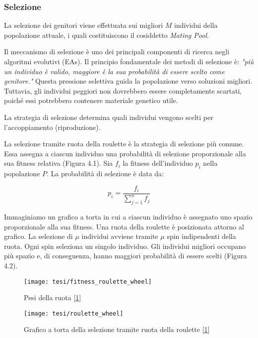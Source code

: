 \subsubsection{Selezione}

La selezione dei genitori viene effettuata sui migliori \( M \) individui della popolazione attuale, i quali costituiscono il cosiddetto \emph{Mating Pool}.

Il meccanismo di selezione è uno dei principali componenti di ricerca negli algoritmi evolutivi (EAs). Il principio fondamentale dei metodi di selezione è: \emph{"più un individuo è valido, maggiore è la sua probabilità di essere scelto come genitore."} Questa pressione selettiva guida la popolazione verso soluzioni migliori. Tuttavia, gli individui peggiori non dovrebbero essere completamente scartati, poiché essi potrebbero contenere materiale genetico utile.

La strategia di selezione determina quali individui vengono scelti per l'accoppiamento (riproduzione).

La selezione tramite ruota della roulette è la strategia di selezione più comune. Essa assegna a ciascun individuo una probabilità di selezione proporzionale alla sua fitness relativa (Figura 4.1). Sia $f_i$ la fitness dell'individuo $p_i$ nella popolazione $P$. La probabilità di selezione è data da:

\[ p_i = \frac{f_i}{\sum_{j=1}^{n} f_j} \]

Immaginiamo un grafico a torta in cui a ciascun individuo è assegnato uno spazio proporzionale alla sua fitness. Una ruota della roulette è posizionata attorno al grafico. La selezione di $\mu$ individui avviene tramite $\mu$ spin indipendenti della ruota. Ogni spin seleziona un singolo individuo. Gli individui migliori occupano più spazio e, di conseguenza, hanno maggiori probabilità di essere scelti (Figura 4.2).
\hypertarget{img6}{}
\begin{figure}[!ht] 
    \centering 
    \texttt{[image: tesi/fitness\_roulette\_wheel]} 
    \caption[Pesi della ruota]{Pesi della ruota [\hyperlink{bibliografia}{1}]}
\end{figure}

\hypertarget{img7}{}
\begin{figure}[!ht] 
    \centering 
    \texttt{[image: tesi/roulette\_wheel]} 
    \caption[Grafico a torta della selezione tramite ruota della roulette]{Grafico a torta della selezione tramite ruota della roulette [\hyperlink{bibliografia}{1}]}
\end{figure}

